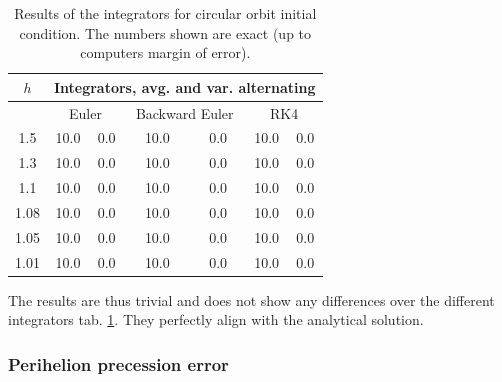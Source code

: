 \begin{table}[!ht]
	\centering
	\caption{Results of the integrators for circular orbit initial condition. The numbers shown are exact (up to computers margin of error). }
	\label{tab:analytical_comp}

	\begin{tabular}{|c|c|c|c|c|c|c|}
		\hline
		$h$ & \multicolumn{6}{|c|}{Integrators, avg. and var. alternating} \\ \hline
		    & \multicolumn{2}{|c|}{Euler} & \multicolumn{2}{|c|}{Backward Euler} & \multicolumn{2}{|c|}{RK4} \\ \hline
		1.5 & 10.0 & 0.0 & 10.0 & 0.0 & 10.0 & 0.0 \\ \hline
		1.3 & 10.0 & 0.0 & 10.0 & 0.0 & 10.0 & 0.0 \\ \hline
		1.1 & 10.0 & 0.0 & 10.0 & 0.0 & 10.0 & 0.0 \\ \hline
		1.08 & 10.0 & 0.0 & 10.0 & 0.0 & 10.0 & 0.0 \\ \hline
		1.05 & 10.0 & 0.0 & 10.0 & 0.0 & 10.0 & 0.0 \\ \hline
		1.01 & 10.0 & 0.0 & 10.0 & 0.0 & 10.0 & 0.0 \\ \hline
	\end{tabular}
\end{table}

The results are thus trivial and does not show any differences over the different integrators tab. \ref{tab:analytical_comp}. They perfectly align with the analytical solution. 

\subsubsection{Perihelion precession error}\label{sec:precession_analysis}

